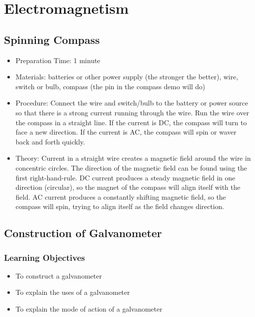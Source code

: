 \section{Electromagnetism}



\subsection{Spinning Compass}
\begin{itemize}
\item{Preparation Time: 1 minute}
\item{Materials: batteries or other power supply (the stronger the better), wire, switch or bulb, compass (the pin in the compass demo will do)}
\item{Procedure: Connect the wire and switch/bulb to the battery or power source so that there is a strong current running through the wire. Run the wire over the compass in a straight line. If the current is DC, the compass will turn to face a new direction. If the current is AC, the compass will spin or waver back and forth quickly.}
\item{Theory: Current in a straight wire creates a magnetic field around the wire in concentric circles. The direction of the magnetic field can be found using the first right-hand-rule. DC current produces a steady magnetic field in one direction (circular), so the magnet of the compass will align itself with the field. AC current produces a constantly shifting magnetic field, so the compass will spin, trying to align itself as the field changes direction.}
\end{itemize}


\subsection{Construction of Galvanometer}

\subsubsection*{Learning Objectives}
\begin{itemize}
\item{To construct a galvanometer}
\item{To explain the uses of a galvanometer}
\item{To explain the mode of action of a galvanometer}
\end{itemize}

